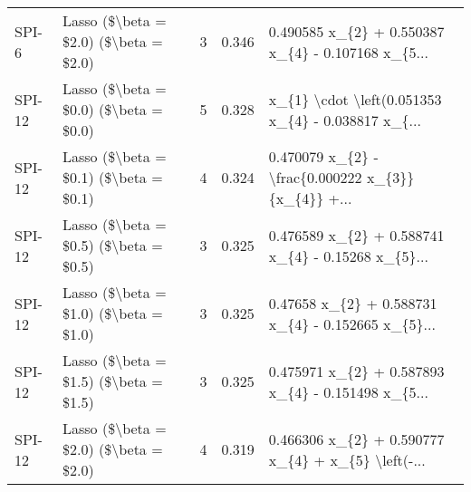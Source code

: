 \begin{tabular}{llrrl}
  SPI-6 & Lasso (\$\textbackslash beta = \$2.0) (\$\textbackslash beta = \$2.0) &         3 & 0.346 & 0.490585 x\_\{2\} + 0.550387 x\_\{4\} - 0.107168 x\_\{5... \\
 SPI-12 & Lasso (\$\textbackslash beta = \$0.0) (\$\textbackslash beta = \$0.0) &         5 & 0.328 & x\_\{1\} \textbackslash cdot \textbackslash left(0.051353 x\_\{4\} - 0.038817 x\_\{... \\
 SPI-12 & Lasso (\$\textbackslash beta = \$0.1) (\$\textbackslash beta = \$0.1) &         4 & 0.324 & 0.470079 x\_\{2\} - \textbackslash frac\{0.000222 x\_\{3\}\}\{x\_\{4\}\} +... \\
 SPI-12 & Lasso (\$\textbackslash beta = \$0.5) (\$\textbackslash beta = \$0.5) &         3 & 0.325 & 0.476589 x\_\{2\} + 0.588741 x\_\{4\} - 0.15268 x\_\{5\}... \\
 SPI-12 & Lasso (\$\textbackslash beta = \$1.0) (\$\textbackslash beta = \$1.0) &         3 & 0.325 & 0.47658 x\_\{2\} + 0.588731 x\_\{4\} - 0.152665 x\_\{5\}... \\
 SPI-12 & Lasso (\$\textbackslash beta = \$1.5) (\$\textbackslash beta = \$1.5) &         3 & 0.325 & 0.475971 x\_\{2\} + 0.587893 x\_\{4\} - 0.151498 x\_\{5... \\
 SPI-12 & Lasso (\$\textbackslash beta = \$2.0) (\$\textbackslash beta = \$2.0) &         4 & 0.319 & 0.466306 x\_\{2\} + 0.590777 x\_\{4\} + x\_\{5\} \textbackslash left(-... \\
\bottomrule
\end{tabular}
